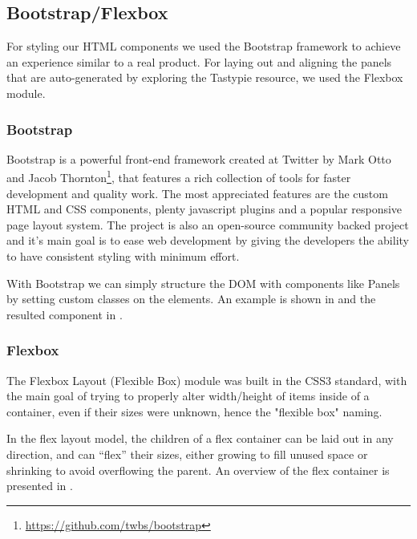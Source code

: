 \subsection{Bootstrap/Flexbox}
\label{sub-sec:bootstrap}

For styling our HTML components we used the Bootstrap framework to achieve an experience similar to a real product. For laying out and aligning the panels that are auto-generated by exploring the Tastypie resource, we used the Flexbox module. 

\subsubsection{Bootstrap}
\label{sub-sub-sec:bootstrap}

Bootstrap is a powerful front-end framework created at Twitter by Mark Otto and Jacob Thornton\footnote{\url{https://github.com/twbs/bootstrap}}, that features a rich collection of tools for faster development and quality work. The most appreciated features are the custom HTML and CSS components, plenty javascript plugins and a popular responsive page layout system. The project is also an open-source community backed project and it's main goal is to ease web development by giving the developers the ability to have consistent styling with minimum effort.

With Bootstrap we can simply structure the DOM with components like Panels by setting custom classes on the elements. An example is shown in  and the resulted component in .





\subsubsection{Flexbox}
\label{sub-sub-sec:flexbox}

The Flexbox Layout (Flexible Box) module was built in the CSS3 standard, with the main goal of trying to properly alter width/height of items inside of a container, even if their sizes were unknown, hence the "flexible box" naming.

In the flex layout model, the children of a flex container can be laid out in any direction, and can “flex” their sizes, either growing to fill unused space or shrinking to avoid overflowing the parent\cite{flexbox}. An overview of the flex container is presented in .


